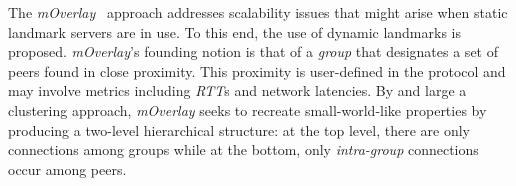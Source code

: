 The \emph{mOverlay}~\cite{ZZZSZ2004} approach addresses scalability issues
that might arise when static landmark servers are in use.
To this end, the use of dynamic landmarks is proposed.
\emph{mOverlay}'s founding notion is that of a \emph{group} that 
designates a set of peers found in close proximity.
This proximity is user-defined in the protocol and 
may involve metrics including \emph{RTT}s and network latencies.
By and large a clustering approach, \emph{mOverlay} seeks to 
recreate small-world-like properties by producing a 
two-level hierarchical structure:
at the top level, there are only connections among groups 
while at the bottom, only \emph{intra-group} connections occur among peers.

